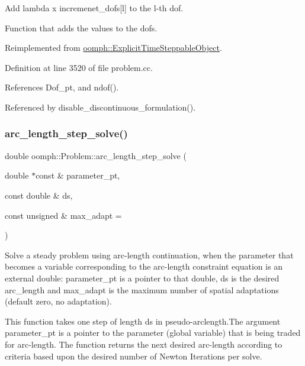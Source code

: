 Add lambda x incremenet\+\_\+dofs\mbox{[}l\mbox{]} to the l-\/th dof. 

Function that adds the values to the dofs. 

Reimplemented from \hyperlink{classoomph_1_1ExplicitTimeSteppableObject_a00f10d9ad6de867dd72ba175a5f0ec89}{oomph\+::\+Explicit\+Time\+Steppable\+Object}.



Definition at line 3520 of file problem.\+cc.



References Dof\+\_\+pt, and ndof().



Referenced by disable\+\_\+discontinuous\+\_\+formulation().

\mbox{\label{classoomph_1_1Problem_ad8414efbd8099d3e6cf3f4daea06cc8f}} 
\subsubsection{\texorpdfstring{arc\+\_\+length\+\_\+step\+\_\+solve()}{arc\_length\_step\_solve()}\hspace{0.1cm}{\footnotesize\ttfamily [1/2]}}
{\footnotesize\ttfamily double oomph\+::\+Problem\+::arc\+\_\+length\+\_\+step\+\_\+solve (\begin{DoxyParamCaption}\item[{double $\ast$const \&}]{parameter\+\_\+pt,  }\item[{const double \&}]{ds,  }\item[{const unsigned \&}]{max\+\_\+adapt = {} }\end{DoxyParamCaption})}



Solve a steady problem using arc-\/length continuation, when the parameter that becomes a variable corresponding to the arc-\/length constraint equation is an external double\+: parameter\+\_\+pt is a pointer to that double, ds is the desired arc\+\_\+length and max\+\_\+adapt is the maximum number of spatial adaptations (default zero, no adaptation). 

This function takes one step of length ds in pseudo-\/arclength.\+The argument parameter\+\_\+pt is a pointer to the parameter (global variable) that is being traded for arc-\/length. The function returns the next desired arc-\/length according to criteria based upon the desired number of Newton Iterations per solve. 

